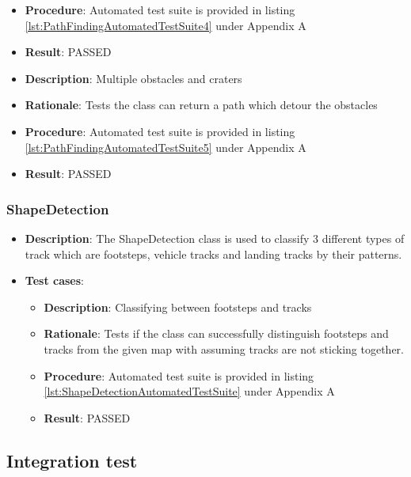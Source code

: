 \documentclass[12pt,a4paper]{article}
\begin{document}
\begin{itemize}
\begin{itemize}
		\item \textbf{Procedure}: Automated test suite is provided in listing \ref{lst:PathFindingAutomatedTestSuite4} under Appendix A
		\item \textbf{Result}: PASSED
	\end{itemize}
    \begin{itemize}
		\item \textbf{Description}:	Multiple obstacles and craters
		\item \textbf{Rationale}: Tests the class can return a path which detour the obstacles
		\item \textbf{Procedure}: Automated test suite is provided in listing \ref{lst:PathFindingAutomatedTestSuite5} under Appendix A
		\item \textbf{Result}: PASSED
	\end{itemize}
	\end{itemize}
    
    \subsubsection{ShapeDetection}
	\begin{itemize}
	\item \textbf{Description}: The ShapeDetection class is used to classify 3 different types of track which are footsteps, vehicle tracks and landing tracks by their patterns.
	\item \textbf{Test cases}:
	\begin{itemize}
		\item \textbf{Description}:	Classifying between footsteps and tracks
		\item \textbf{Rationale}: Tests if the class can successfully distinguish footsteps and tracks from the given map with assuming tracks are not sticking together.  
		\item \textbf{Procedure}: Automated test suite is provided in listing \ref{lst:ShapeDetectionAutomatedTestSuite} under Appendix A
		\item \textbf{Result}: PASSED
	\end{itemize}
	\end{itemize}
	
	\subsection{Integration test}
\end{document}
